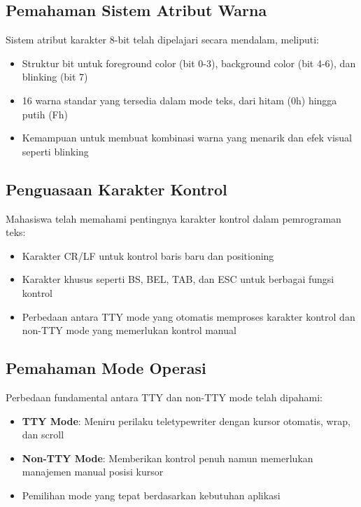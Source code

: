 \documentclass[../main.tex]{subfiles}
\begin{document}
        \subsection{Pemahaman Sistem Atribut Warna}
            Sistem atribut karakter 8-bit telah dipelajari secara mendalam, meliputi:
            \begin{itemize}
                \item Struktur bit untuk foreground color (bit 0-3), background color (bit 4-6), dan blinking (bit 7)
                \item 16 warna standar yang tersedia dalam mode teks, dari hitam (0h) hingga putih (Fh)
                \item Kemampuan untuk membuat kombinasi warna yang menarik dan efek visual seperti blinking
            \end{itemize}

        \subsection{Penguasaan Karakter Kontrol}
            Mahasiswa telah memahami pentingnya karakter kontrol dalam pemrograman teks:
            \begin{itemize}
                \item Karakter CR/LF untuk kontrol baris baru dan positioning
                \item Karakter khusus seperti BS, BEL, TAB, dan ESC untuk berbagai fungsi kontrol
                \item Perbedaan antara TTY mode yang otomatis memproses karakter kontrol dan non-TTY mode yang memerlukan kontrol manual
            \end{itemize}

        \subsection{Pemahaman Mode Operasi}
            Perbedaan fundamental antara TTY dan non-TTY mode telah dipahami:
            \begin{itemize}
                \item \textbf{TTY Mode}: Meniru perilaku teletypewriter dengan kursor otomatis, wrap, dan scroll
                \item \textbf{Non-TTY Mode}: Memberikan kontrol penuh namun memerlukan manajemen manual posisi kursor
                \item Pemilihan mode yang tepat berdasarkan kebutuhan aplikasi
            \end{itemize}
\end{document}
